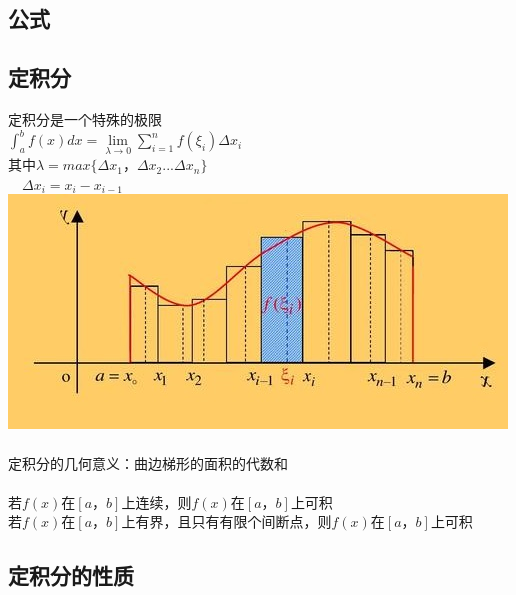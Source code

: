 \documentclass{article}
\begin{document}
\begin{flushleft}
	\LARGE
	
	\section{公式}
	
	\subsection{定积分}
	
	定积分是一个特殊的极限\\
	$\int_{a}^{b}f(x)dx=\lim\limits_{\lambda\to 0}\sum_{i=1}^{n}f(\xi_i)\Delta x_i$\\
	其中$\lambda = max\{\Delta x_1， \Delta x_2...\Delta x_n\}$\\
	\ \ $\Delta x_i=x_i-x_{i-1}$\\
	\includegraphics[scale=1.0]{2.jpg}\\
	~\\
	定积分的几何意义：曲边梯形的面积的代数和\\
	~\\
	若$f(x)$在$[a，b]$上连续，则$f(x)$在$[a，b]$上可积\\
	若$f(x)$在$[a，b]$上有界，且只有有限个间断点，则$f(x)$在$[a，b]$上可积\\
	
	\subsection{定积分的性质}
	

\end{flushleft}
\end{document}
